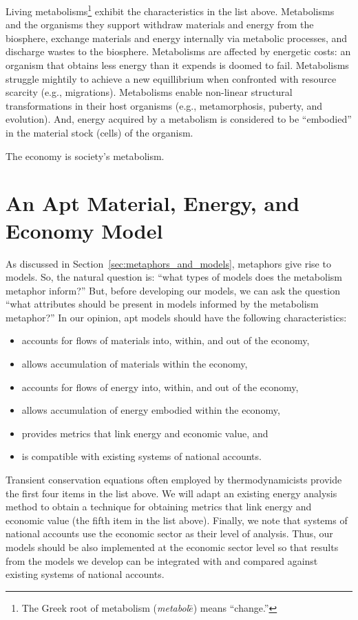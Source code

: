 Living metabolisms\footnote{The 
	Greek root of metabolism 
	(\emph{metabol$\bar{e}$}) means ``change.''}
exhibit the characteristics in the list above.
Metabolisms and the organisms they support
withdraw materials and energy from the biosphere, 
exchange materials and energy internally via metabolic processes, 
and discharge wastes to the biosphere.
Metabolisms are affected by energetic costs: 
an organism that obtains less energy than it expends 
is doomed to fail.
Metabolisms struggle mightily to achieve a new equillibrium
when confronted with resource scarcity (e.g., migrations).
Metabolisms enable non-linear structural transformations 
in their host organisms (e.g., metamorphosis, puberty, and evolution).
And, energy acquired by a metabolism is considered to be ``embodied''
in the material stock (cells) of the organism.

The economy is society's metabolism. 


\section{An Apt Material, Energy, and Economy Model}
\label{sec:apt_models}

As discussed in Section~\ref{sec:metaphors_and_models}, 
metaphors give rise to models.
So, the natural question is: 
``what types of models does the metabolism metaphor inform?''
But, before developing our models, we can ask the question
``what attributes should be present in models informed
by the metabolism metaphor?'' 
In our opinion, apt models should have the following characteristics:

\begin{itemize}
	\item{accounts for flows of materials into, within, and out of the economy,}
	\item{allows accumulation of materials within the economy,}
	\item{accounts for flows of energy into, within, and out of the economy,}
	\item{allows accumulation of energy embodied within the economy,}
	\item{provides metrics that link energy and economic value, and}
	\item{is compatible with existing systems of national accounts.}
\end{itemize}

Transient conservation equations often employed by thermodynamicists 
provide the first four items in the list above.
We will adapt an existing energy analysis method to obtain a 
technique for obtaining metrics that link energy and economic value
(the fifth item in the list above).
Finally, we note that systems of national accounts use the economic sector
as their level of analysis. 
Thus, our models should be also implemented at the economic sector level
so that results from the models we develop can be 
integrated with and compared against existing systems of national accounts.



